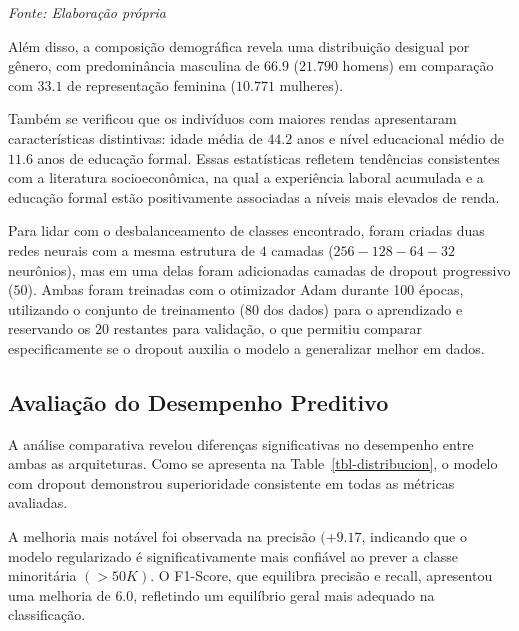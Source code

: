 \documentclass[
  oneclumn]{article}
\begin{document}
\begin{minipage}{\textwidth}
\centering
\vspace{-10pt}
\footnotesize \textit{Fonte: Elaboração própria}
\end{minipage}

Além disso, a composição demográfica revela uma distribuição desigual
por gênero, com predominância masculina de \(66.9%
\) (\(21.790\) homens) em comparação com \(33.1%
\) de representação feminina (\(10.771\) mulheres).

Também se verificou que os indivíduos com maiores rendas apresentaram
características distintivas: idade média de \(44.2\) anos e nível
educacional médio de \(11.6\) anos de educação formal. Essas
estatísticas refletem tendências consistentes com a literatura
socioeconômica, na qual a experiência laboral acumulada e a educação
formal estão positivamente associadas a níveis mais elevados de renda.

Para lidar com o desbalanceamento de classes encontrado, foram criadas
duas redes neurais com a mesma estrutura de \(4\) camadas
(\(256-128-64-32\) neurônios), mas em uma delas foram adicionadas
camadas de dropout progressivo (\(50%
\)). Ambas foram treinadas com o otimizador Adam durante 100 épocas,
utilizando o conjunto de treinamento (\(80%
\) dos dados) para o aprendizado e reservando os \(20%
\) restantes para validação, o que permitiu comparar especificamente se
o dropout auxilia o modelo a generalizar melhor em dados.

\subsection{Avaliação do Desempenho
Preditivo}\label{avaliauxe7uxe3o-do-desempenho-preditivo}

A análise comparativa revelou diferenças significativas no desempenho
entre ambas as arquiteturas. Como se apresenta na
Table~\ref{tbl-distribucion}, o modelo com dropout demonstrou
superioridade consistente em todas as métricas avaliadas.

A melhoria mais notável foi observada na precisão \((+9.17%
\), indicando que o modelo regularizado é significativamente mais
confiável ao prever a classe minoritária \((>50K)\). O F1-Score, que
equilibra precisão e recall, apresentou uma melhoria de \(6.0%
\), refletindo um equilíbrio geral mais adequado na classificação.
\end{document}
